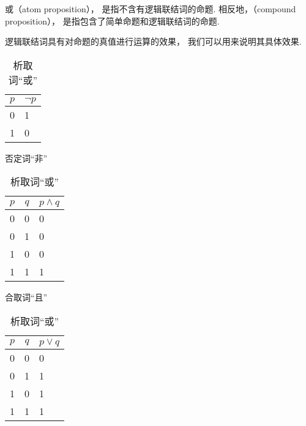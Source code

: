 \begin{definition}
或（atom proposition），%
是指不含有逻辑联结词的命题.
相反地，（compound proposition），%
是指包含了简单命题和逻辑联结词的命题.
\end{definition}

逻辑联结词具有对命题的真值进行运算的效果，%
我们可以用来说明其具体效果.

\begin{table}[ht]
\centering
\begin{subtable}[ht]{0.9\textwidth}
\centering
\begin{tabular}{|c|p{1.5cm}|}
\hline
\(p\) & \(\neg p\) \\ \hline
0 & 1 \\ \hline
1 & 0 \\ \hline
\end{tabular}
\caption{否定词“非”}
\end{subtable}

\begin{subtable}[ht]{0.45\textwidth}
\centering
\begin{tabular}{|*{2}{c|}p{2cm}|}
\hline
\(p\) & \(q\) & \(p \land q\) \\ \hline
0 & 0 & 0 \\ \hline
0 & 1 & 0 \\ \hline
1 & 0 & 0 \\ \hline
1 & 1 & 1 \\ \hline
\end{tabular}
\caption{合取词“且”}
\end{subtable}
\begin{subtable}[ht]{0.45\textwidth}
\centering
\begin{tabular}{|*{2}{c|}p{2cm}|}
\hline
\(p\) & \(q\) & \(p \lor q\) \\ \hline
0 & 0 & 0 \\ \hline
0 & 1 & 1 \\ \hline
1 & 0 & 1 \\ \hline
1 & 1 & 1 \\ \hline
\end{tabular}
\caption{析取词“或”}
\end{subtable}


\end{table}
